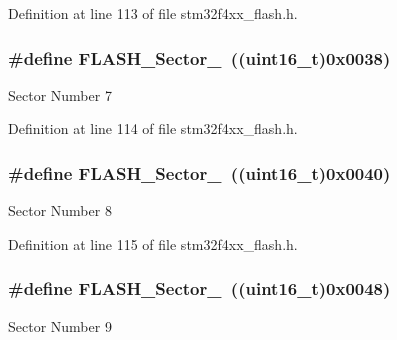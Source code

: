 Definition at line 113 of file stm32f4xx\-\_\-flash.\-h.

\hypertarget{group___f_l_a_s_h___sectors_ga143c0665510327a7ec97052e6d6bb53a}{
\subsubsection[{F\-L\-A\-S\-H\-\_\-\-Sector\-\_\-7}]{\setlength{\rightskip}{0pt plus 5cm}\#define F\-L\-A\-S\-H\-\_\-\-Sector\-\_~((uint16\-\_\-t)0x0038)}}\label{group___f_l_a_s_h___sectors_ga143c0665510327a7ec97052e6d6bb53a}
Sector Number 7 

Definition at line 114 of file stm32f4xx\-\_\-flash.\-h.

\hypertarget{group___f_l_a_s_h___sectors_ga27a8e02b4fcfe7863a95f38a78ca52a6}{
\subsubsection[{F\-L\-A\-S\-H\-\_\-\-Sector\-\_\-8}]{\setlength{\rightskip}{0pt plus 5cm}\#define F\-L\-A\-S\-H\-\_\-\-Sector\-\_~((uint16\-\_\-t)0x0040)}}\label{group___f_l_a_s_h___sectors_ga27a8e02b4fcfe7863a95f38a78ca52a6}
Sector Number 8 

Definition at line 115 of file stm32f4xx\-\_\-flash.\-h.

\hypertarget{group___f_l_a_s_h___sectors_ga717c6135a9ed6aa633796faf695fc2cd}{
\subsubsection[{F\-L\-A\-S\-H\-\_\-\-Sector\-\_\-9}]{\setlength{\rightskip}{0pt plus 5cm}\#define F\-L\-A\-S\-H\-\_\-\-Sector\-\_~((uint16\-\_\-t)0x0048)}}\label{group___f_l_a_s_h___sectors_ga717c6135a9ed6aa633796faf695fc2cd}
Sector Number 9 


